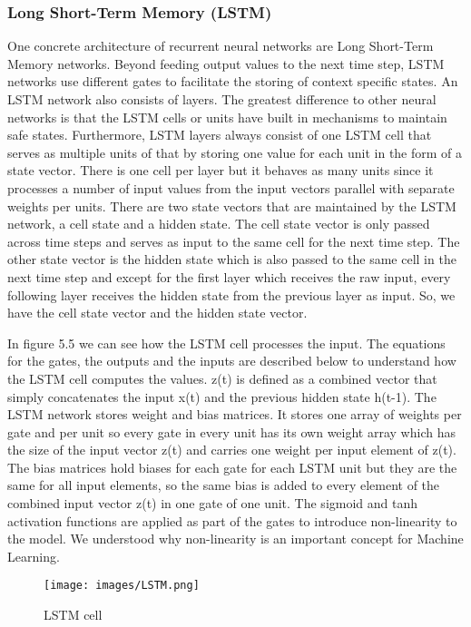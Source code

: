 \documentclass[a4paper,12pt]{report}
\begin{document}
	\subsubsection{Long Short-Term Memory (LSTM)}
	One concrete architecture of recurrent neural networks are Long Short-Term Memory networks. Beyond feeding output values to the next time step, LSTM networks use different gates to facilitate the storing of context specific states. An LSTM network also consists of layers. The greatest difference to other neural networks is that the LSTM cells or units have built in mechanisms to maintain safe states. Furthermore, LSTM layers always consist of one LSTM cell that serves as multiple units of that by storing one value for each unit in the form of a state vector. There is one cell per layer but it behaves as many units since it processes a number of input values from the input vectors parallel with separate weights per units. There are two state vectors that are maintained by the LSTM network, a cell state and a hidden state. The cell state vector is only passed across time steps and serves as input to the same cell for the next time step. The other state vector is the hidden state which is also passed to the same cell in the next time step and except for the first layer which receives the raw input, every following layer receives the hidden state from the previous layer as input. So, we have the cell state vector and the hidden state vector.
	
	
In figure 5.5 we can see how the LSTM cell processes the input. The equations for the gates, the outputs and the inputs are described below to understand how the LSTM cell computes the values. z(t) is defined as a combined vector that simply concatenates the input x(t) and the previous hidden state h(t-1). The LSTM network stores weight and bias matrices. It stores one array of weights per gate and per unit so every gate in every unit has its own weight array which has the size of the input vector z(t) and carries one weight per input element of z(t). The bias matrices hold biases for each gate for each LSTM unit but they are the same for all input elements, so the same bias is added to every element of the combined input vector z(t) in one gate of one unit. The sigmoid and tanh activation functions are applied as part of the gates to introduce non-linearity to the model. We understood why non-linearity is an important concept for Machine Learning.	
	
	
	
\begin{figure}[htbp]
  \centering
  \texttt{[image: images/LSTM.png]}
  \caption{LSTM cell}
  \label{fig:fullwidth}
\end{figure}
\end{document}
